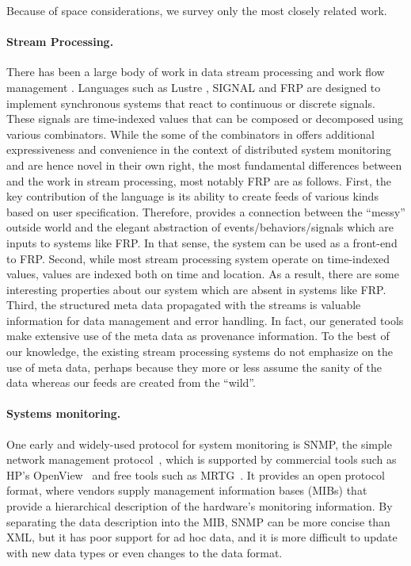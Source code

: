 
Because of space considerations, we survey only the most closely related work.

\paragraph*{Stream Processing.}
There has been a large body of work in data stream processing and work flow
management \cite{Golab03}. Languages such as Lustre \cite{CaspiPHP87}, 
SIGNAL  \cite{AmagbegnonBG95} and FRP \cite{ElliottH97,WanH00}
are designed to implement synchronous systems that react to continuous
or discrete signals. These signals are time-indexed values that can be
composed or decomposed using various combinators. 
While the some of the combinators in \padsd{} offers 
additional expressiveness and convenience in the context of 
distributed system monitoring and are hence novel in their own right, 
the most fundamental differences between \padsd{} and the work in 
stream processing, most notably FRP are as follows.
First, the key contribution of the \padsd{} language is its ability to create
feeds of various kinds based on user specification.  
Therefore, \padsd{} provides a connection between the ``messy'' outside
world and the elegant abstraction of events/behaviors/signals which are inputs
to systems like FRP. In that sense, the \padsd{} system
can be used as a front-end to FRP.
Second, while most stream processing system operate on time-indexed values,
\padsd{} values are indexed both on time and location. As a result, there are
some interesting properties about our system which are absent in systems like FRP.
Third, the structured meta data propagated with the streams is valuable
information for data management and error handling. In fact, our generated tools
make extensive use of the meta data as provenance information. To the best of
our knowledge, the existing stream processing systems do not emphasize on
the use of meta data, perhaps because they more or less assume the sanity 
of the data whereas our feeds are created from the ``wild''. 


\paragraph*{Systems monitoring.}
One early and widely-used protocol for system monitoring is SNMP, the
simple network management protocol~\cite{snmprfc1157}, which is
supported by commercial tools such as HP's OpenView~\cite{openview}
and free tools such as MRTG~\cite{mrtg}. It provides an open protocol
format, where vendors supply management information bases (MIBs)
that provide a hierarchical description of the hardware's monitoring
information. By separating the data description into the MIB, SNMP
can be more concise than XML, but it has poor support for ad hoc
data, and it is more difficult to update with new data types or even 
changes to the data format.

